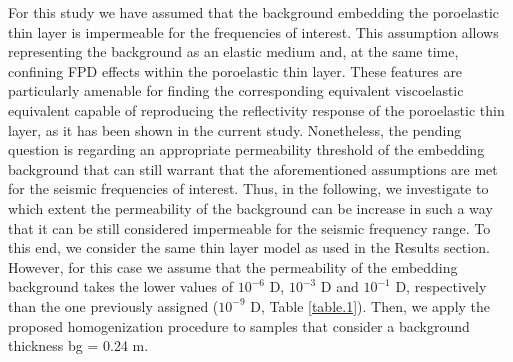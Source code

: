 \documentclass[draft]{agujournal2019}
\begin{document}
For this study we have assumed that the background embedding the poroelastic thin layer is impermeable for the frequencies of interest. This assumption allows representing the background as an elastic medium and, at the same time, confining FPD effects within the poroelastic thin layer.
These features are particularly amenable for finding the corresponding equivalent viscoelastic equivalent capable of reproducing the reflectivity response of the poroelastic thin layer, as it has been shown in the current study. Nonetheless, the pending question is regarding an appropriate permeability threshold of the embedding background that can still warrant that the aforementioned assumptions are met for the seismic frequencies of interest. Thus, in the following, we investigate to which extent the permeability of the background can be increase in such a way that it can be still considered impermeable for the seismic frequency range.
To this end, we consider the same thin layer model as used in the Results section. However, for this case we assume that the permeability of the embedding background takes the lower values of $10^{-6}$ D, $10^{-3}$ D and $10^{-1}$ D, respectively than the one previously assigned ($10^{-9}$ D, Table \ref{table.1}). Then, we apply the proposed homogenization procedure to samples that consider a background thickness bg = 0.24 m. 
\end{document}
